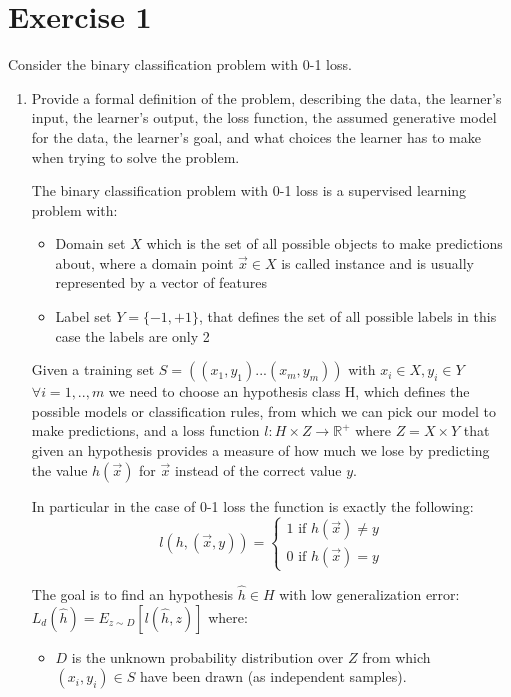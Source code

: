 \documentclass[a4paper,11pt,oneside]{book}
\begin{document}
\section{Exercise 1}
Consider the binary classification problem with 0-1 loss.
\begin{enumerate}
\item Provide a formal definition of the problem, describing the data, the learner's input, the learner's output, the loss function, the assumed generative model for the data, the learner's goal, and what choices the learner has to make when trying to solve the problem.
    \begin{solution}
        The binary classification problem with 0-1 loss is a supervised learning problem with:
        \begin{itemize}
        \item Domain set $X$ which is the set of all possible objects to make predictions about, where a domain point $\vec{x} \in X$ is called instance and is usually represented by a vector of features
        \item Label set $Y = \{-1,+1\}$, that defines the set of all possible labels in this case the labels are only 2
        \end{itemize}
        
        Given a training set $S = ((x_1, y_1) ... (x_m, y_m))$ with $x_i \in X, y_i \in Y$ $\forall i = 1,..,m$ we need to choose an hypothesis class H, which defines the possible models or classification rules, from which we can pick our model to make predictions, and a loss function $l: H \times Z \to \mathbb{R}^+$ where $Z = X \times Y$ that given an hypothesis provides a measure of how much we lose by predicting the value $h(\vec{x})$ for $\vec{x}$ instead of the correct value $y$.
        
        In particular in the case of 0-1 loss the function is exactly the following:
        $$l(h, (\vec{x},y)) = \begin{cases}
        1 \text{ if } h(\vec{x}) \neq y \\
        0 \text{ if } h(\vec{x}) = y
        \end{cases}$$
        
        The goal is to find an hypothesis $\hat{h} \in H$ with low generalization error: $L_d(\hat{h}) = E_{z\sim D}[l(\hat{h},z)]$ where:
        \begin{itemize}
        \item $D$ is the unknown probability distribution over $Z$ from which $(x_i, y_i) \in S$ have been drawn (as independent samples).
        \end{itemize}
    \end{solution}


\end{enumerate}
\end{document}
